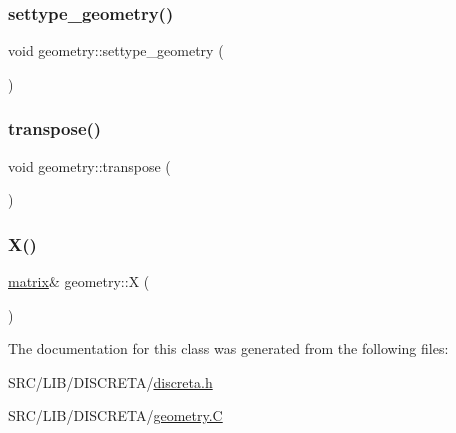 \subsubsection{\texorpdfstring{settype\+\_\+geometry()}{settype\_geometry()}}
{\footnotesize\ttfamily void geometry\+::settype\+\_\+geometry (\begin{DoxyParamCaption}{ }\end{DoxyParamCaption})}

\mbox{\label{classgeometry_ad7132289ee0bc683f8c00c6762bb5035}} 
\subsubsection{\texorpdfstring{transpose()}{transpose()}}
{\footnotesize\ttfamily void geometry\+::transpose (\begin{DoxyParamCaption}{ }\end{DoxyParamCaption})}

\mbox{\label{classgeometry_a2eff9c42b83c90012092d49218237d9d}} 
\subsubsection{\texorpdfstring{X()}{X()}}
{\footnotesize\ttfamily \mbox{\hyperlink{classmatrix}{matrix}}\& geometry\+::X (\begin{DoxyParamCaption}{ }\end{DoxyParamCaption})\hspace{0.3cm}{\ttfamily [inline]}}



The documentation for this class was generated from the following files\+:\begin{DoxyCompactItemize}
\item 
S\+R\+C/\+L\+I\+B/\+D\+I\+S\+C\+R\+E\+T\+A/\mbox{\hyperlink{discreta_8h}{discreta.\+h}}\item 
S\+R\+C/\+L\+I\+B/\+D\+I\+S\+C\+R\+E\+T\+A/\mbox{\hyperlink{geometry_8_c}{geometry.\+C}}\end{DoxyCompactItemize}
